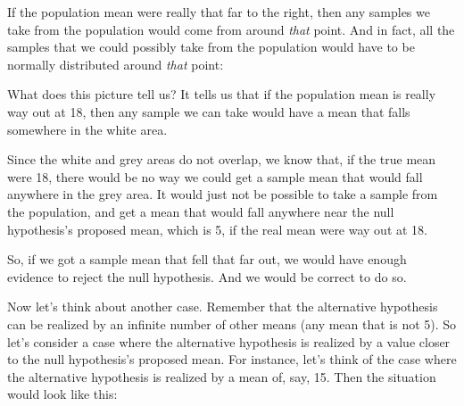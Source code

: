 \documentclass[../../../main.tex]{subfiles}
\begin{document}
\noindent
If the population mean were really that far to the right, then any samples we take from the population would come from around \emph{that} point. And in fact, all the samples that we could possibly take from the population would have to be normally distributed around \emph{that} point:

\begin{center}
\end{center}

\noindent
What does this picture tell us? It tells us that if the population mean is really way out at 18, then any sample we can take would have a mean that falls somewhere in the white area.

Since the white and grey areas do not overlap, we know that, if the true mean were 18, there would be no way we could get a sample mean that would fall anywhere in the grey area. It would just not be possible to take a sample from the population, and get a mean that would fall anywhere near the null hypothesis's proposed mean, which is 5, if the real mean were way out at 18. 

So, if we got a sample mean that fell that far out, we would have enough evidence to reject the null hypothesis. And we would be correct to do so.

Now let's think about another case. Remember that the alternative hypothesis can be realized by an infinite number of other means (any mean that is not 5). So let's consider a case where the alternative hypothesis is realized by a value closer to the null hypothesis's proposed mean. For instance, let's think of the case where the alternative hypothesis is realized by a mean of, say, 15. Then the situation would look like this:
\end{document}
